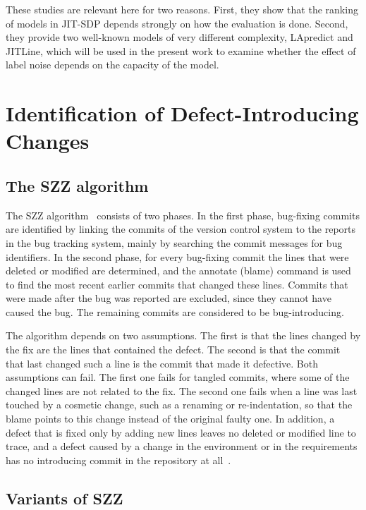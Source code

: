 \documentclass[12pt,a4paper,oneside]{report}
\begin{document}
These studies are relevant here for two reasons. First, they show that the
ranking of models in JIT-SDP depends strongly on how the evaluation is done.
Second, they provide two well-known models of very different complexity,
LApredict and JITLine, which will be used in the present work to examine whether
the effect of label noise depends on the capacity of the model.

\section{Identification of Defect-Introducing Changes}

\subsection{The SZZ algorithm}

The SZZ algorithm~\cite{sliwerski2005szz} consists of two phases. In the
first phase, bug-fixing commits are identified by linking the commits of the
version control system to the reports in the bug tracking system, mainly by
searching the commit messages for bug identifiers. In the second phase, for
every bug-fixing commit the lines that were deleted or modified are
determined, and the annotate (blame) command is used to find the most recent
earlier commits that changed these lines. Commits that were made after the bug
was reported are excluded, since they cannot have caused the bug. The
remaining commits are considered to be bug-introducing.

The algorithm depends on two assumptions. The first is that the lines changed
by the fix are the lines that contained the defect. The second is that the
commit that last changed such a line is the commit that made it defective.
Both assumptions can fail. The first one fails for tangled commits, where
some of the changed lines are not related to the fix. The second one fails
when a line was last touched by a cosmetic change, such as a renaming or
re-indentation, so that the blame points to this change instead of the
original faulty one. In addition, a defect that is fixed only by adding new
lines leaves no deleted or modified line to trace, and a defect caused by a
change in the environment or in the requirements has no introducing commit in
the repository at all~\cite{rodriguez2020bugs}.

\subsection{Variants of SZZ}
\end{document}
